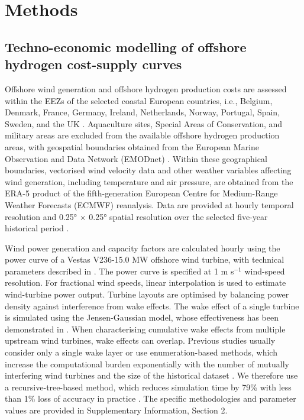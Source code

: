 \documentclass[pdflatex,lineno,sn-mathphys,Numbered]{sn-jnl}%
\begin{document}
\section{Methods}\label{sec11}

\subsection{Techno-economic modelling of offshore hydrogen cost-supply curves}

Offshore wind generation and offshore hydrogen production costs are assessed within the EEZs of the selected coastal European countries, i.e., Belgium, Denmark, France, Germany, Ireland, Netherlands, Norway, Portugal, Spain, Sweden, and the UK \cite{Marineregions}. Aquaculture sites, Special Areas of Conservation, and military areas are excluded from the available offshore hydrogen production areas, with geospatial boundaries obtained from the European Marine Observation and Data Network (EMODnet) \cite{EMODnet}.
Within these geographical boundaries, vectorised wind velocity data and other weather variables affecting wind generation, including temperature and air pressure, are obtained from the ERA-5 product of the fifth-generation European Centre for Medium-Range Weather Forecasts (ECMWF) reanalysis. Data are provided at hourly temporal resolution and 0.25° $\times$ 0.25° spatial resolution over the selected five-year historical period \cite{ERA5}.

Wind power generation and capacity factors are calculated hourly using the power curve of a Vestas V236-15.0 MW offshore wind turbine, with technical parameters described in \cite{V23615}. The power curve is specified at 1 m s$^{-1}$ wind-speed resolution. For fractional wind speeds, linear interpolation is used to estimate wind-turbine power output.
Turbine layouts are optimised by balancing power density against interference from wake effects. The wake effect of a single turbine is simulated using the Jensen-Gaussian model, whose effectiveness has been demonstrated in \cite{tao2019optimal}.
When characterising cumulative wake effects from multiple upstream wind turbines, wake effects can overlap. Previous studies usually consider only a single wake layer or use enumeration-based methods, which increase the computational burden exponentially with the number of mutually interfering wind turbines and the size of the historical dataset \cite{paul2019multi, tao2020joint}. We therefore use a recursive-tree-based method, which reduces simulation time by 79\% with less than 1\% loss of accuracy in practice \cite{Figshare}.
The specific methodologies and parameter values are provided in Supplementary Information, Section 2.
\end{document}
